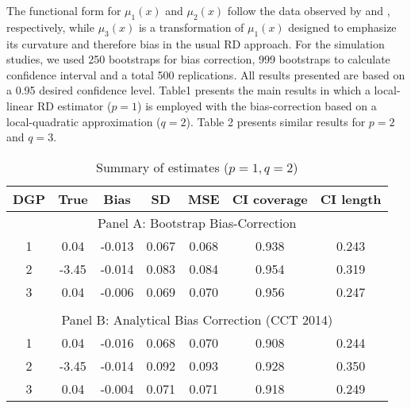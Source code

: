 \documentclass[12pt,fleqn]{article}
\begin{document}
The functional form for $\mu_{1}(x)$ and $\mu_{2}(x)$ follow the data observed by \cite{lee2008} and \cite{ludwig2007}, respectively, while $\mu_{3}(x)$ is a transformation of $\mu_{1}(x)$ designed to emphasize its curvature and therefore bias in the usual RD approach. For the simulation studies, we used 250 bootstraps for bias correction, 999 bootstraps to calculate confidence interval and a total 500 replications. All results presented are based on a 0.95 desired confidence level. Table1 presents the main results in which a local-linear RD estimator ($p=1$) is employed with the bias-correction based on a local-quadratic approximation ($q=2$). Table 2 presents similar results for $p=2$ and $q=3$.

\begin{table}[ht] \label{Tb1}
	\caption{Summary of estimates ($p = 1, q = 2$)}
	\centering
	\begin{tabular}{ccccccc}
		\hline
		DGP & True & Bias & SD & MSE & CI coverage & CI length \\ 
		\hline
		\multicolumn{7}{c}{Panel A: Bootstrap Bias-Correction} \\
		1 & 0.04 & -0.013 & 0.067 & 0.068 & 0.938 & 0.243 \\ 
		2 & -3.45 & -0.014 & 0.083 & 0.084 & 0.954 & 0.319 \\ 
		3 & 0.04 & -0.006 & 0.069 & 0.070 & 0.956 & 0.247 \\ 
		&&&&&& \\
		\multicolumn{7}{c}{Panel B: Analytical Bias Correction (CCT 2014)} \\
		1 & 0.04 & -0.016 & 0.068 & 0.070 & 0.908 & 0.244 \\ 
		2 & -3.45 & -0.014 & 0.092 & 0.093 & 0.928 & 0.350 \\ 
		3 & 0.04 & -0.004 & 0.071 & 0.071 & 0.918 & 0.249 \\ 
		\hline
	\end{tabular}
\end{table}
\end{document}
